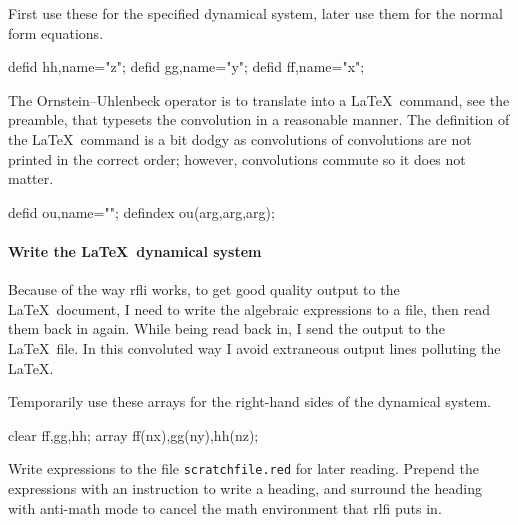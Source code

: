 \documentclass[11pt,a5paper]{article}
\def\ou\big(#1,#2,#3\big){{{\rm e}^{\if#31\else#3\fi t}\star}#1\,}
\begin{document}
First use these for the specified dynamical system, later
use them for the normal form equations.
\begin{reduce}
defid hh,name="\dot z";
defid gg,name="\dot y";
defid ff,name="\dot x";
\end{reduce}

The Ornstein--Uhlenbeck operator is to translate into a
\LaTeX\ command, see the preamble, that typesets the
convolution in a reasonable manner. The definition of the
\LaTeX\ command is a bit dodgy as convolutions of
convolutions are not printed in the correct order; however, 
convolutions commute so it does not matter.
\begin{reduce}
defid ou,name="\ou";
defindex ou(arg,arg,arg);
\end{reduce}


\paragraph{Write the \LaTeX\ dynamical system}

Because of the way rfli works, to get good quality output to
the \LaTeX\ document, I need to write the algebraic
expressions to a file, then read them back in again. While
being read back in, I send the output to the \LaTeX\ file.
In this convoluted way I avoid extraneous output lines
polluting the \LaTeX. 

Temporarily use these arrays for the right-hand sides of the
dynamical system.
\begin{reduce}
clear ff,gg,hh;
array ff(nx),gg(ny),hh(nz);
\end{reduce}

Write expressions to the file \verb|scratchfile.red| for
later reading. Prepend the expressions with an instruction
to write a heading, and surround the heading with anti-math
mode to cancel the math environment that rlfi puts in.
\end{document}

